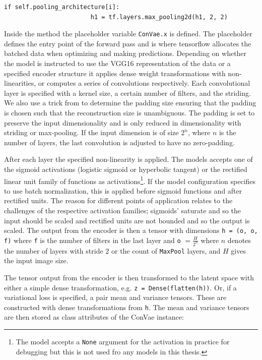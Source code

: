 \begin{lstlisting}[language=iPython]
                    if self.pooling_architecture[i]:
                        h1 = tf.layers.max_pooling2d(h1, 2, 2)

\end{lstlisting}

Inside the method the placeholder variable \lstinline{ConVae.x} is defined. The placeholder defines the entry point of the forward pass and is where tensorflow allocates the batched data when optimizing and making predictions. Depending on whether the model is instructed to use the VGG16 representation of the data or a specified encoder structure it applies dense weight transformations with non-linearities, or computes a series of convolutions respectively. Each convolutional layer is specified with a kernel size, a certain number of filters, and the striding. We also use a trick from \citet{Guo2017} to determine the padding size ensuring that the padding is chosen such that the reconstruction size is unambiguous. The padding is set to preserve the input dimensionality and is only reduced in dimensionality with striding or max-pooling. If the input dimension is of size $2^n$, where $n$ is the number of layers, the last convolution is adjusted to have no zero-padding. 

After each layer the specified non-linearity is applied. The models accepts one of the sigmoid activations (logistic sigmoid or hyperbolic tangent) or the rectified linear unit family of functions as activations\footnote{The model accepts a \lstinline{None} argument for the activation in practice for debugging but this is not used fro any models in this thesis.}. If the model configuration specifies to use batch normalization, this is applied before sigmoid functions and after rectified units. The reason for different points of application relates to the challenges of the respective activation families; sigmoids' saturate and so the input should be scaled and rectified units are not bounded and so the output is scaled. The output from the encoder is then a tensor with dimensions \lstinline{h = (o, o, f)} where \lstinline{f} is the number of filters in the last layer and \lstinline{o} $= \frac{H}{2^n}$ where $n$ denotes the number of layers with stride $2$ or the count of \lstinline{MaxPool} layers, and $H$ gives the input image size.

The tensor output from the encoder is then transformed to the latent space with either a simple dense transformation, e.g. \lstinline{z = Dense(flatten(h))}. Or, if a variational loss is specified, a pair mean and variance tensors. These are constructed with dense transformations from \lstinline{h}. The mean and variance tensors are then stored as class attributes of the ConVae instance:

